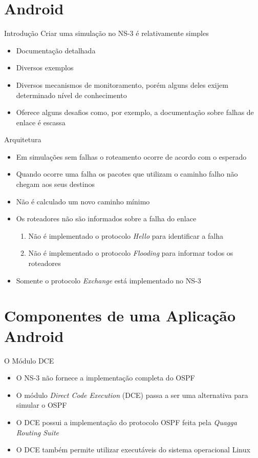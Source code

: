 \documentclass{beamer}
\newlength{\wideitemsep}
\let\olditem\item
\renewcommand{\item}{\setlength{\itemsep}{\wideitemsep}\olditem}
\begin{document}
\section{Android} %
\begin{frame}{Introdução}
Criar uma simulação no NS-3 é relativamente simples
\begin{itemize}
 \item Documentação detalhada %
 \item Diversos exemplos %
 \item Diversos mecanismos de monitoramento, porém alguns deles exijem determinado nível de conhecimento %
 \item Oferece alguns desafios como, por exemplo, a documentação sobre falhas de enlace é escassa %
\end{itemize}
\end{frame}

\begin{frame}{Arquitetura}
\begin{itemize}
 \item Em simulações sem falhas o roteamento ocorre de acordo com o esperado %
 \item Quando ocorre uma falha os pacotes que utilizam o caminho falho não chegam aos seus destinos %
 \item Não é calculado um novo caminho mínimo %
 \item Os roteadores não são informados sobre a falha do enlace %
  \begin{enumerate}
   \olditem Não é implementado o protocolo \textit{Hello} para identificar a falha %
   \olditem Não é implementado o protocolo \textit{Flooding} para informar todos os roteadores %
  \end{enumerate}
 \item Somente o protocolo \textit{Exchange} está implementado no NS-3 %
\end{itemize}
\end{frame}

\section{Componentes de uma Aplicação Android}
\begin{frame}{O Módulo DCE}
\begin{itemize}
 \item O NS-3 não fornece a implementação completa do OSPF %
 \item O módulo \textit{Direct Code Execution} (DCE) passa a ser uma alternativa para simular o OSPF %
 \item O DCE possui a implementação do protocolo OSPF feita pela \textit{Quagga Routing Suite} %
 \item O DCE também permite utilizar executáveis do sistema operacional Linux %
\end{itemize}
\end{frame}
\end{document}

